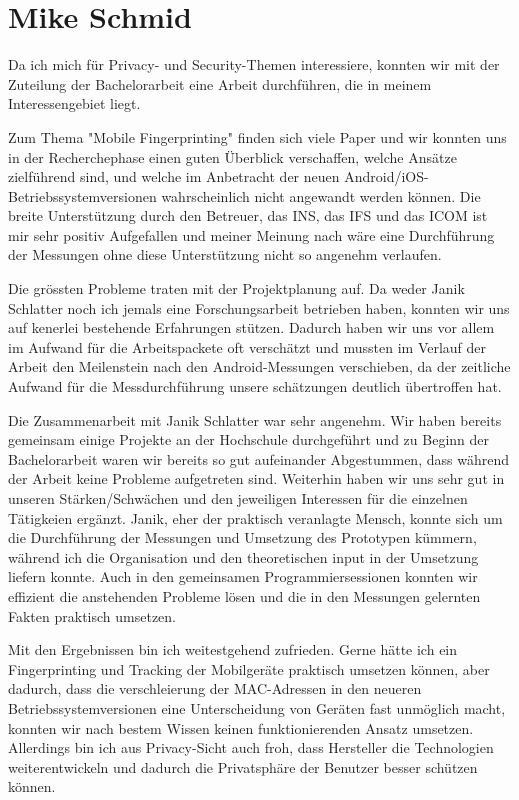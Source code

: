 \section*{Mike Schmid}
Da ich mich für Privacy- und Security-Themen interessiere, konnten wir mit der 
Zuteilung der Bachelorarbeit eine Arbeit durchführen, 
die in meinem Interessengebiet liegt.

Zum Thema "Mobile Fingerprinting" finden sich viele Paper und wir konnten uns 
in der Recherchephase einen guten Überblick verschaffen, welche Ansätze 
zielführend sind, und welche im Anbetracht der neuen 
Android/iOS-Betriebssystemversionen wahrscheinlich nicht angewandt werden können.
Die breite Unterstützung durch den Betreuer, das INS, das IFS und das ICOM ist mir
sehr positiv Aufgefallen und meiner Meinung nach wäre eine Durchführung der 
Messungen ohne diese Unterstützung nicht so angenehm verlaufen.

Die grössten Probleme traten mit der Projektplanung auf. 
Da weder Janik Schlatter noch ich jemals eine Forschungsarbeit betrieben haben,
konnten wir uns auf kenerlei bestehende Erfahrungen stützen. 
Dadurch haben wir uns vor allem im Aufwand für die Arbeitspackete oft verschätzt
und mussten im Verlauf der Arbeit den Meilenstein nach den Android-Messungen 
verschieben, da der zeitliche Aufwand für die Messdurchführung unsere schätzungen
deutlich übertroffen hat.

Die Zusammenarbeit mit Janik Schlatter war sehr angenehm. 
Wir haben bereits gemeinsam einige Projekte an der Hochschule durchgeführt und 
zu Beginn der Bachelorarbeit waren wir bereits so gut aufeinander Abgestummen,
dass während der Arbeit keine Probleme aufgetreten sind.
Weiterhin haben wir uns sehr gut in unseren Stärken/Schwächen und den 
jeweiligen Interessen für die einzelnen Tätigkeien ergänzt. 
Janik, eher der praktisch veranlagte Mensch, konnte sich um die Durchführung der 
Messungen und Umsetzung des Prototypen kümmern, während ich die Organisation 
und den theoretischen input in der Umsetzung liefern konnte.
Auch in den gemeinsamen Programmiersessionen konnten wir effizient die anstehenden
Probleme lösen und die in den Messungen gelernten Fakten praktisch umsetzen.

Mit den Ergebnissen bin ich weitestgehend zufrieden. Gerne hätte ich ein 
Fingerprinting und Tracking der Mobilgeräte praktisch umsetzen können, 
aber dadurch, dass  die verschleierung der MAC-Adressen in den neueren 
Betriebssystemversionen eine Unterscheidung von Geräten fast unmöglich macht,
konnten wir nach bestem Wissen keinen funktionierenden Ansatz umsetzen.
Allerdings bin ich aus Privacy-Sicht auch froh, 
dass Hersteller die Technologien weiterentwickeln und dadurch die 
Privatsphäre der Benutzer besser schützen können.  



\clearpage

